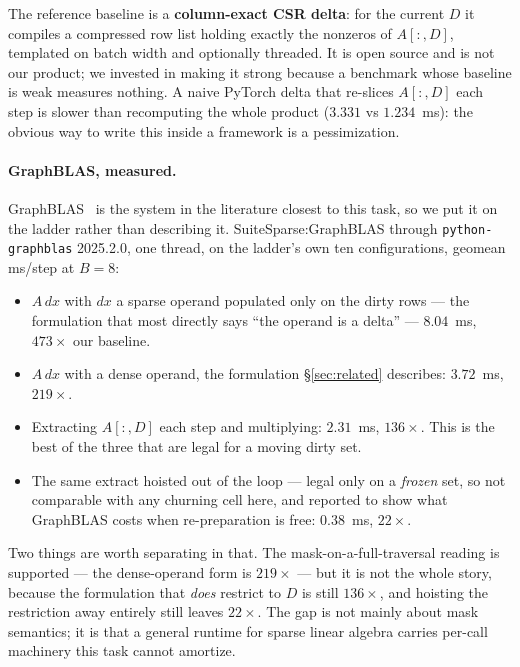 \documentclass{article}
\begin{document}
The reference baseline is a \textbf{column-exact CSR delta}: for the current $D$
it compiles a compressed row list holding exactly the nonzeros of $A[:,D]$,
templated on batch width and optionally threaded. It is open source and is not
our product; we invested in making it strong because a benchmark whose baseline
is weak measures nothing. A naive PyTorch delta that re-slices $A[:,D]$ each
step is slower than recomputing the whole product ($3.331$ vs $1.234$~ms): the
obvious way to write this inside a framework is a pessimization.

\paragraph{GraphBLAS, measured.}
GraphBLAS~\citep{davis2019, graphblas2023} is the system in the literature
closest to this task, so we put it on the ladder rather than describing it.
SuiteSparse:GraphBLAS through \texttt{python-graphblas} 2025.2.0, one thread,
on the ladder's own ten configurations, geomean ms/step at $B{=}8$:

\begin{itemize}\itemsep2pt
  \item $A \, dx$ with $dx$ a sparse operand populated only on the dirty rows ---
    the formulation that most directly says ``the operand is a delta'' ---
    $8.04$~ms, $473\times$ our baseline.
  \item $A \, dx$ with a dense operand, the formulation \S\ref{sec:related}
    describes: $3.72$~ms, $219\times$.
  \item Extracting $A[:, D]$ each step and multiplying: $2.31$~ms, $136\times$.
    This is the best of the three that are legal for a moving dirty set.
  \item The same extract hoisted out of the loop --- legal only on a
    \emph{frozen} set, so not comparable with any churning cell here, and
    reported to show what GraphBLAS costs when re-preparation is free:
    $0.38$~ms, $22\times$.
\end{itemize}

Two things are worth separating in that. The mask-on-a-full-traversal reading is
supported --- the dense-operand form is $219\times$ --- but it is not the whole
story, because the formulation that \emph{does} restrict to $D$ is still
$136\times$, and hoisting the restriction away entirely still leaves $22\times$.
The gap is not mainly about mask semantics; it is that a general runtime for sparse linear
algebra carries per-call machinery this task cannot amortize.
\end{document}

